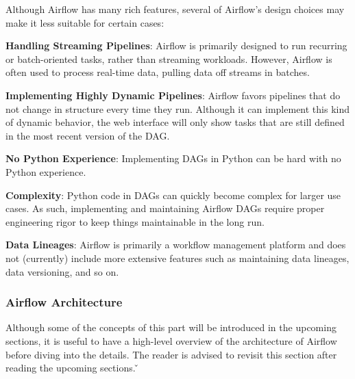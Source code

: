 Although Airflow has many rich features, several of Airflow's design choices may make it less suitable for certain
cases:
\bit
\item \textbf{Handling Streaming Pipelines}: Airflow is primarily designed to run recurring or batch-oriented tasks,
rather than streaming workloads. However, Airflow is often used to process real-time data, pulling data off streams in
batches.
\item \textbf{Implementing Highly Dynamic Pipelines}: Airflow favors pipelines that do not change in structure every
time they run. Although it can implement this kind of dynamic behavior, the web interface will only show tasks that are
still defined in the most recent version of the DAG\@.
\item \textbf{No Python Experience}: Implementing DAGs in Python can be hard with no Python experience.
\item \textbf{Complexity}: Python code in DAGs can quickly become complex for larger use cases. As such, implementing
and maintaining Airflow DAGs require proper engineering rigor to keep things maintainable in the long run.
\item \textbf{Data Lineages}: Airflow is primarily a workflow management platform and does not (currently) include more
extensive features such as maintaining data lineages, data versioning, and so on.
\eit

\subsubsection{Airflow Architecture}

Although some of the concepts of this part will be introduced in the upcoming sections, it is useful to have a
high-level overview of the architecture of Airflow before diving into the details. The reader is advised to revisit
this section after reading the upcoming sections. \v

